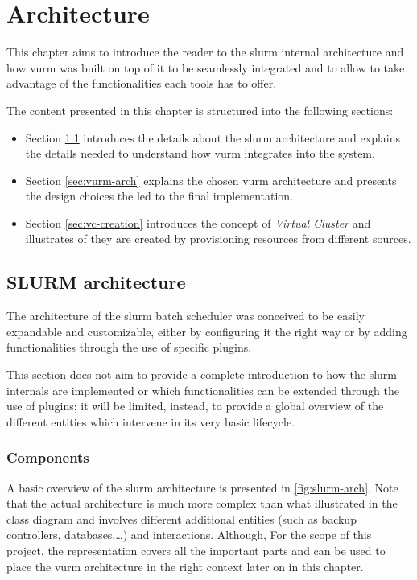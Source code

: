 \chapter{Architecture}
\label{sec:architecture}

This chapter aims to introduce the reader to the \gls{slurm} internal architecture and how \gls{vurm} was built on top of it to be seamlessly integrated and to allow to take advantage of the functionalities each tools has to offer.

The content presented in this chapter is structured into the following sections:

\begin{itemize}
	\item Section \ref{sec:slurm-arch} introduces the details about the \gls{slurm} architecture and explains the details needed to understand how \gls{vurm} integrates into the system.
	\item Section \ref{sec:vurm-arch} explains the chosen \gls{vurm} architecture and presents the design choices the led to the final implementation.
	\item Section \ref{sec:vc-creation} introduces the concept of \emph{Virtual Cluster} and illustrates of they are created by provisioning resources from different sources.
\end{itemize}


\section{SLURM architecture}
\label{sec:slurm-arch}

The architecture of the \gls{slurm} batch scheduler was conceived to be easily expandable and customizable, either by configuring it the right way or by adding functionalities through the use of specific plugins.

This section does not aim to provide a complete introduction to how the \gls{slurm} internals are implemented or which functionalities can be extended through the use of plugins; it will be limited, instead, to provide a global overview of the different entities which intervene in its very basic lifecycle.

\subsection{Components}

A basic overview of the \gls{slurm} architecture is presented in \autoref{fig:slurm-arch}. Note that the actual architecture is much more complex than what illustrated in the class diagram and involves different additional entities (such as backup controllers, databases,…) and interactions. Although, For the scope of this project, the representation covers all the important parts and can be used to place the \gls{vurm} architecture in the right context later on in this chapter.

